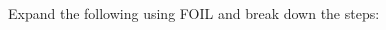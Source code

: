 \documentclass[12pt, a4paper, addpoints]{exam}
\newcommand{\nonmonicnegativeleadtrail}{%
    \pgfmathtruncatemacro{\a}{random(2,5)} %
    \pgfmathtruncatemacro{\b}{random(1,5)} %
    \edef\result{(\a x - \b)(\a x - \b)}%
    \result
}
\begin{document}
\begin{questions}
\question
Expand the following using FOIL and break down the steps:
\setlength{\columnsep}{20pt}
\begin{multicols}{2}
\begin{parts}
    \part \( \nonmonicnegativeleadtrail \)
    \ps
\end{parts}
\end{multicols}

\end{questions}
\end{document}
